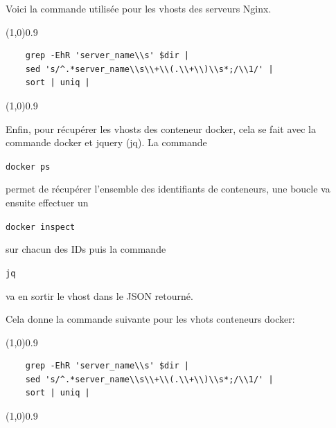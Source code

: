 \documentclass[12pt]{article}
\begin{document}
Voici la commande utilisée pour les vhosts des serveurs Nginx.
\vspace{-1ex}
\begin{code}
\vspace{-1ex}
\begin{center} 
    \line(1,0){0.9\textwidth} 
\end{center}
\vspace{-1ex}
\begin{verbatim}
    grep -EhR 'server_name\\s' $dir | 
    sed 's/^.*server_name\\s\\+\\(.\\+\\)\\s*;/\\1/' |
    sort | uniq |
\end{verbatim}
    \vspace{-1ex}
\begin{center} 
    \line(1,0){0.9\textwidth} 
\end{center}
\end{code}


Enfin, pour récupérer les vhosts des conteneur docker, cela se fait avec la commande docker et jquery (jq).
La commande \begin{code}\texttt{docker ps}\end{code} permet de récupérer l'ensemble des identifiants de conteneurs, une boucle va ensuite effectuer un \begin{code} \texttt{docker inspect}\end{code} sur chacun des IDs puis la commande \begin{code} \texttt{jq}\end{code}  va en sortir le vhost dans le JSON retourné.

Cela donne la commande suivante pour les vhots conteneurs docker:
\vspace{-1ex}
\begin{code}
\vspace{-1ex}
\begin{center} 
    \line(1,0){0.9\textwidth} 
\end{center}
\vspace{-1ex}
\begin{verbatim}
    grep -EhR 'server_name\\s' $dir | 
    sed 's/^.*server_name\\s\\+\\(.\\+\\)\\s*;/\\1/' |
    sort | uniq |
\end{verbatim}
\vspace{-1ex}
\begin{center} 
    \line(1,0){0.9\textwidth} 
\end{center}
\end{code}
\end{document}
